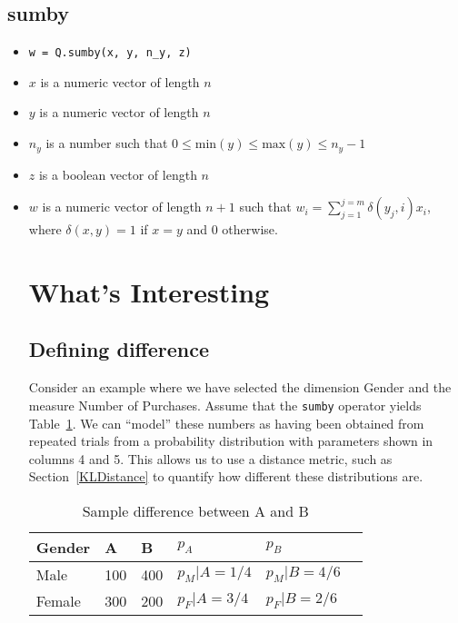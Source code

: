 \subsection{sumby}
\label{sumby}
\begin{itemize}
\item \verb+w = Q.sumby(x, y, n_y, z)+ 
\item \(x\) is a numeric vector of length \(n\)
\item \(y\) is a numeric vector of length \(n\)
\item \(n_y\) is a number such that 
\(0 \leq \mathrm{min}(y) \leq \mathrm{max}(y) \leq n_y-1\)
\item \(z\) is a boolean vector of length \(n\)
\item \(w\) is a numeric vector of length \(n+1\) such that 
\(w_i = \sum_{j=1}^{j=m} \delta(y_j, i) x_i\), where \(\delta(x, y) = 1 \) if
\(x = y\) and 0 otherwise.
\ei

\section{What's Interesting}
\label{interesting}

\subsection{Defining difference}

Consider an example where we have selected the dimension Gender and the measure Number of Purchases. Assume that 
the {\tt sumby} operator yields Table~\ref{tbl_sample_diff}. We can
``model'' these numbers as having been obtained from repeated trials from a
probability distribution with parameters shown in columns 4 and 5. This allows
us to use a distance metric, such as Section~\ref{KLDistance} to quantify how
different these distributions are.

\begin{table}
\centering
\begin{tabular}{|l|l|l|l|l|l|} \hline \hline
{\bf Gender}   & {\bf A } & {\bf B } & \(p_A\) & \(p_B\)  \\ \hline
Male & 100 & 400  &\(p_M|A = 1/4\)  &  \(p_M|B = 4/6\)  \\ \hline
Female & 300 & 200  & \(p_F|A =3/4\) & \(p_F|B = 2/6\)  \\ \hline
\hline
\end{tabular}
\caption{Sample difference between A and B}
\label{tbl_sample_diff}
\end{table}


\end{itemize}

